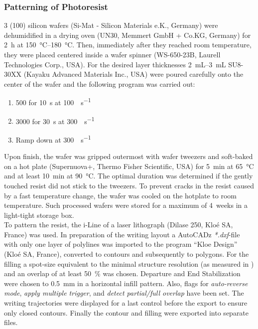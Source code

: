 \subsubsection{Patterning of Photoresist}
\SI{3}{\inch} (100) silicon wafers (Si-Mat - Silicon Materials e.K., Germany) were dehumidified in a drying oven (UN30, Memmert GmbH + Co.KG, Germany) for \SI{2}{\hour} at \SIrange{150}{180}{\degreeCelsius}. Then, immediately after they reached room temperature, they were placed centered inside a wafer spinner (WS-650-23B, Laurell Technologies Corp., USA). For the desired layer thicknesses \SIrange{2}{3}{\milli\liter} SU8-30XX (Kayaku Advanced Materials Inc., USA) were poured carefully onto the center of the wafer and the following program was carried out:
\begin{enumerate}[noitemsep]
\item \SI{500}{\rpm} for \SI{10}{s} at \SI{100}{\rpm\per\second}
\item \SI{3000}{\rpm} for \SI{30}{s} at \SI{300}{\rpm\per\second}
\item Ramp down at \SI{300}{\rpm\per\second}
\end{enumerate}
Upon finish, the wafer was gripped outermost with wafer tweezers and soft-baked on a hot plate (Supernuova+, Thermo Fisher Scientific, USA) for \SI{5}{\minute} at \SI{65}{\degreeCelsius} and at least \SI{10}{\minute} at \SI{90}{\degreeCelsius}. The optimal duration was determined if the gently touched resist did not stick to the tweezers. To prevent cracks in the resist caused by a fast temperature change, the wafer was cooled on the hotplate to room temperature. Such processed wafers were stored for a maximum of \SI{4}{weeks} in a light-tight storage box.\\
To pattern the resist, the i-Line of a laser lithograph (Dilase 250, Klo\'{e} SA, France) was used. In preparation of the writing layout a AutoCADz \textit{*.dxf}-file with only one layer of polylines was imported to the program ``Kloe Design'' (Klo\'{e} SA, France), converted to contours and subsequently to polygons. For the filling a spot-size equivalent to the minimal structure resolution (as measured in \citet{lit:tech:rojda2020}) and an overlap of at least \SI{50}{\percent} was chosen. Departure and End Stabilization were chosen to \SI{.5}{\milli\meter} in a horizontal infill pattern. Also, flags for \textit{auto-reverse mode}, \textit{apply multiple trigger}, and \textit{detect partial/full overlap} have been set.  The writing trajectories were displayed for a last control before the export to ensure only closed contours. Finally the contour and filling were exported into separate files.\\
